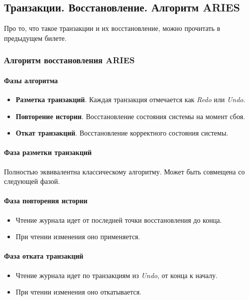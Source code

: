 \subsection{Транзакции. Восстановление. Алгоритм ARIES}

Про то, что такое транзакции и их восстановление, можно прочитать в предыдущем билете.

\subsubsection{Алгоритм восстановления ARIES}

\paragraph{Фазы алгоритма}

\begin{itemize}
	\item \textbf{Разметка транзакций}. Каждая транзакция отмечается как
	      \textit{Redo} или \textit{Undo}.
	\item \textbf{Повторение истории}. Восстановление состояния системы на момент сбоя.
	\item \textbf{Откат транзакций}. Восстановление корректного состояния системы.
\end{itemize}

\paragraph{Фаза разметки транзакций}

Полностью эквивалентна классическому алгоритму. Может быть совмещена со следующей фазой.

\paragraph{Фаза повторения истории}

\begin{itemize}
	\item Чтение журнала идет от последней точки восстановления до конца.
	\item При чтении изменения оно применяется.
\end{itemize}

\paragraph{Фаза отката транзакций}

\begin{itemize}
	\item Чтение журнала идет по транзакциям из \textit{Undo}, от конца к началу.
	\item При чтении изменения оно откатывается.
\end{itemize}

